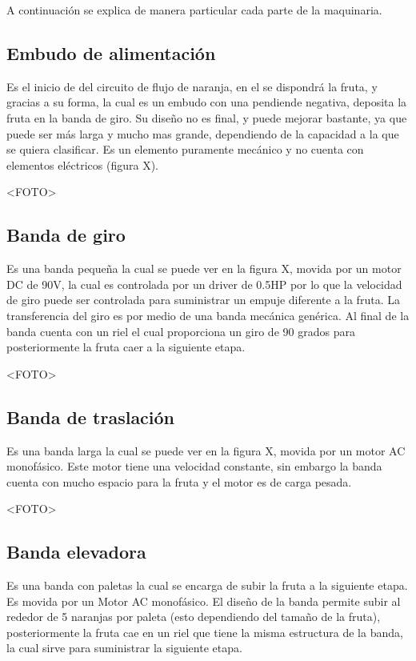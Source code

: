 \documentclass[twoside,spanish,ESP,MSc]{plantillaLabUPV}
\theoremstyle{definition}
\begin{document}
A continuación se explica de manera particular cada parte de la maquinaria.

\subsection{Embudo de alimentación}
Es el inicio de del circuito de flujo de naranja, en el se dispondrá la fruta, y gracias a su forma, la cual es un embudo con una pendiende negativa, deposita la fruta en la banda de giro. Su diseño no es final, y puede mejorar bastante, ya que puede ser más larga y mucho mas grande, dependiendo de la capacidad a la que se quiera clasificar. Es un elemento puramente mecánico y no cuenta con elementos eléctricos (figura X). 


<FOTO>

\subsection{Banda de giro}
Es una banda pequeña la cual se puede ver en la figura X, movida por un motor DC de 90V, la cual es controlada por un driver de 0.5HP por lo que la velocidad de giro puede ser controlada para suministrar un empuje diferente a la fruta. La transferencia del giro es por medio de una banda mecánica genérica. Al final de la banda cuenta con un riel el cual proporciona un giro de 90 grados para posteriormente la fruta caer a la siguiente etapa.


<FOTO>

\subsection{Banda de traslación}
Es una banda larga la cual se puede ver en la figura X, movida por un motor AC monofásico. Este motor tiene una velocidad constante, sin embargo la banda cuenta con mucho espacio para la fruta y el motor es de carga pesada.


<FOTO>

\subsection{Banda elevadora}
Es una banda con paletas la cual se encarga de subir la fruta a la siguiente etapa. Es movida por un Motor AC monofásico. El diseño de la banda permite subir al rededor de 5 naranjas por paleta (esto dependiendo del tamaño de la fruta), posteriormente la fruta cae en un riel que tiene la misma estructura de la banda, la cual sirve para suministrar la siguiente etapa.
\end{document}
